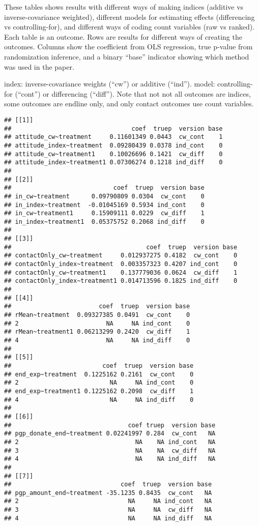 \documentclass[
]{article}
\begin{document}
These tables shows results with different ways of making indices
(additive vs inverse-covariance weighted), different models for
estimating effects (differencing vs controlling-for), and different ways
of coding count variables (raw vs ranked). Each table is an outcome.
Rows are results for different ways of creating the outcomes. Columns
show the coefficient from OLS regression, true p-value from
randomization inference, and a binary ``base'' indicator showing which
method was used in the paper.

index: inverse-covariance weights (``cw'') or additive (``ind''). model:
controlling-for (``cont'') or differencing (``diff''). Note that not not
all outcomes are indices, some outcomes are endline only, and only
contact outcomes use count variables.

\begin{verbatim}
## [[1]]
##                                 coef  truep  version base
## attitude_cw~treatment     0.11601349 0.0443  cw_cont    1
## attitude_index~treatment  0.09280439 0.0378 ind_cont    0
## attitude_cw~treatment1    0.10026696 0.1421  cw_diff    0
## attitude_index~treatment1 0.07306274 0.1218 ind_diff    0
## 
## [[2]]
##                            coef  truep  version base
## in_cw~treatment      0.09790809 0.0304  cw_cont    0
## in_index~treatment  -0.01045169 0.5934 ind_cont    0
## in_cw~treatment1     0.15909111 0.0229  cw_diff    1
## in_index~treatment1  0.05375752 0.2068 ind_diff    0
## 
## [[3]]
##                                     coef  truep  version base
## contactOnly_cw~treatment     0.012937275 0.4182  cw_cont    0
## contactOnly_index~treatment  0.003357323 0.4207 ind_cont    0
## contactOnly_cw~treatment1    0.137779036 0.0624  cw_diff    1
## contactOnly_index~treatment1 0.014713596 0.1825 ind_diff    0
## 
## [[4]]
##                        coef  truep  version base
## rMean~treatment  0.09327385 0.0491  cw_cont    0
## 2                        NA     NA ind_cont    0
## rMean~treatment1 0.06213299 0.2420  cw_diff    1
## 4                        NA     NA ind_diff    0
## 
## [[5]]
##                         coef  truep  version base
## end_exp~treatment  0.1225162 0.2161  cw_cont    0
## 2                         NA     NA ind_cont    0
## end_exp~treatment1 0.1225162 0.2098  cw_diff    1
## 4                         NA     NA ind_diff    0
## 
## [[6]]
##                                coef truep  version base
## pgp_donate_end~treatment 0.02241997 0.284  cw_cont   NA
## 2                                NA    NA ind_cont   NA
## 3                                NA    NA  cw_diff   NA
## 4                                NA    NA ind_diff   NA
## 
## [[7]]
##                              coef  truep  version base
## pgp_amount_end~treatment -35.1235 0.8435  cw_cont   NA
## 2                              NA     NA ind_cont   NA
## 3                              NA     NA  cw_diff   NA
## 4                              NA     NA ind_diff   NA
\end{verbatim}
\end{document}
